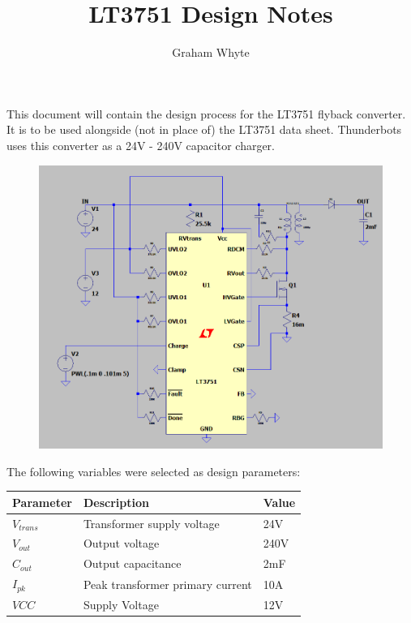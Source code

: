 \documentclass{article}
\title{LT3751 Design Notes}
\author{Graham Whyte}
\begin{document}
	\maketitle
	\noindent This document will contain the design process for the LT3751 flyback converter. It is to be used alongside (not in place of) the LT3751 data sheet. Thunderbots uses this converter as a 24V - 240V capacitor charger. \\
	
	\begin{figure}[h!]
		\includegraphics[width=\linewidth]{LT3571_Tbots_Configuration.png}
	\end{figure}
	
	\noindent The following variables were selected as design parameters:
	
	\begin{table}[h]
		\centering
		\begin{tabular}{lll}
			\textbf{Parameter}   & \textbf{Description}                      & \textbf{Value} \\
			\hline
			$V_{trans}$ & Transformer supply voltage       & 24V   \\
			$V_{out}$   & Output voltage                   & 240V  \\
			$C_{out}$   & Output capacitance               & 2mF   \\
			$I_{pk}$    & Peak transformer primary current & 10A  \\
			$VCC$		& Supply Voltage				   & 12V
		\end{tabular}
		\centering
	\end{table}
	
\end{document}
